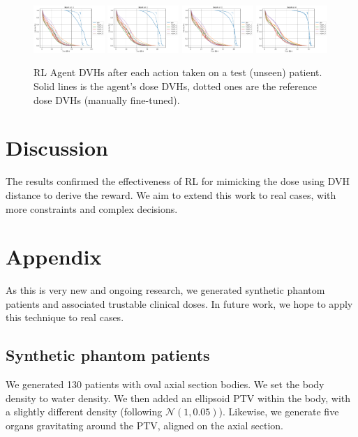 \begin{figure}
	\centering
	\includegraphics[width=0.24\textwidth]{steps/distance-test-w1.pdf}	\includegraphics[width=0.24\textwidth]{steps/distance-test-w2.pdf}	\includegraphics[width=0.24\textwidth]{steps/distance-test-w3.pdf}	\includegraphics[width=0.24\textwidth]{steps/distance-test-w4.pdf}
	\caption{RL Agent DVHs after each action taken on a test (unseen) patient. Solid lines is the agent's dose DVHs, dotted ones are the reference dose DVHs (manually fine-tuned).}
	\label{fig:steps}
\end{figure}

\section{Discussion}
The results confirmed the effectiveness of RL for mimicking the dose using DVH distance to derive the reward.
We aim to extend this work to real cases, with more constraints and complex decisions.

\section*{Appendix}
As this is very new and ongoing research, we generated synthetic phantom patients and associated trustable clinical doses.
In future work, we hope to apply this technique to real cases.

\subsection*{Synthetic phantom patients}
We generated 130 patients with oval axial section bodies.
We set the body density to water density.
We then added an ellipsoid PTV within the body, with a slightly different density (following $\mathcal{N}(1,0.05)$).
Likewise, we generate five organs gravitating around the PTV, aligned on the axial section.

